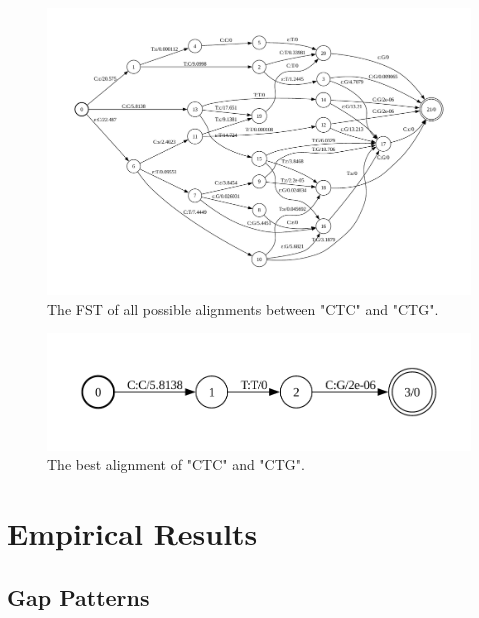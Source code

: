 \documentclass[
]{article}
\begin{document}
\begin{figure}

{\centering \includegraphics{figures/aln-example-graph} 

}

\caption{The FST of all possible alignments between "CTC" and "CTG".}\label{fig:aln-example-a}
\end{figure}

\begin{figure}

{\centering \includegraphics[width=0.75\linewidth]{figures/aln-example-path} 

}

\caption{The best alignment of "CTC" and "CTG".}\label{fig:aln-example-b}
\end{figure}

\newpage

\hypertarget{empirical-results}{%
\section{Empirical Results}\label{empirical-results}}

\hypertarget{gap-patterns}{%
\subsection{Gap Patterns}\label{gap-patterns}}
\end{document}
